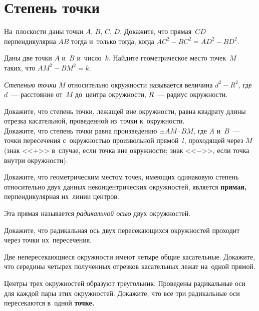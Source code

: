 
\section*{Степень точки}


\begin{problems}

\item
На~плоскости даны точки $A$, $B$, $C$, $D$.
Докажите, что прямая~$CD$ перпендикулярна $AB$ тогда и~только тогда, когда
$AC^2 - BC^2 = AD^2 - BD^2$.

\item
Даны две точки $A$ и~$B$ и~число~$k$.
Найдите геометрическое место точек~$M$ таких, что $AM^2 - BM^2 = k$.

\end{problems}

\emph{Степенью точки} $M$ относительно окружности называется величина
$d^2 - R^2$, где $d$~--- расстояние от~$M$ до~центра окружности,
$R$~--- радиус окружности.

\begin{problems}

\item
\subproblem
Докажите, что степень точки, лежащей вне окружности, равна квадрату длины
отрезка касательной, проведенной из~точки к~окружности.
\\
\subproblem
Докажите, что степень точки равна произведению $\pm AM \cdot BM$, где
$A$ и~$B$~--- точки пересечения с~окружностью произвольной прямой~$l$,
проходящей через $M$ (знак <<$+$>> в~случае, если точка вне окружности;
знак <<$-$>>, если точка внутри окружности).

\item
Докажите, что геометрическим местом точек, имеющих одинаковую степень
относительно двух данных неконцентрических окружностей, является
\textbf{прямая,} перпендикулярная их~линии центров.

\end{problems}

Эта прямая называется \emph{радикальной осью} двух окружностей.

Докажите, что радикальная ось двух пересекающихся окружностей проходит через точки их~пересечения.

\begin{problems}

\item
Две непересекающиеся окружности имеют четыре общие касательные.
Докажите, что середины четырех полученных отрезков касательных лежат на~одной
прямой.

\item
Центры трех окружностей образуют треугольник.
Проведены радикальные оси для каждой пары этих окружностей.
Докажите, что все три радикальные оси пересекаются в~одной \textbf{точке.}

\end{problems}

